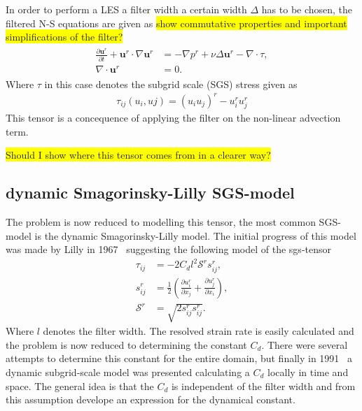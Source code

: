 In order to perform a LES a filter width a certain width $\Delta$ has to be chosen, 
the filtered N-S equations are given as 
\colorbox{yellow}{show commutative properties and important simplifications of the filter?}
%
\begin{align}
    \begin{split}
        \frac{\partial \mathbf{u}^r}{\partial t} + \mathbf{u}^r\cdot \nabla\mathbf{u}^r
        &= -\nabla p^r +\nu\Delta \mathbf{u}^r-\nabla \cdot \tau, \\
        \nabla \cdot \mathbf{u}^r &= 0.
    \end{split}
	\label{eq:NSfiltered}
\end{align}
%
Where $\tau$ in this case denotes the subgrid scale (SGS) stress given as 
\begin{align}
    \tau_{ij}(u_i,uj) = (u_iu_j)^r -u_i^ru_j^r
    \label{eq:sgstensor}
\end{align}
%
This tensor is a concequence of applying the filter on the non-linear advection term.

\colorbox{yellow}{Should I show where this tensor comes from in a clearer way?}

\subsection{dynamic Smagorinsky-Lilly SGS-model}
The problem is now reduced to modelling this tensor, the most common SGS-model is the 
dynamic Smagorinsky-Lilly model. The initial progress of this model was made by 
Lilly in 1967~\cite{Lilly67} suggesting the following model of the sgs-tensor
%
\begin{align}
    \tau_{ij} &= -2C_dl^2\mathcal{S}^rs_{ij}^r,\\
    s^r_{ij} &= \frac{1}{2}\left( \frac{\partial u^r_i}{\partial x_j} +
    \frac{\partial u^r_j}{\partial x_i}\right),\\
    \mathcal{S}^r &= \sqrt{2s^r_{ij}s^r_{ij}}.
    \label{eq:boussinesq}
\end{align}
%
Where $l$ denotes the filter width.
The resolved strain rate is easily calculated and the problem is now reduced to determining
the constant $C_d$. There were several attempts to determine this constant for the entire domain,
but finally in 1991~\cite{Germano91} a dynamic subgrid-scale model was presented calculating a 
$C_d$ locally in time and space. The general idea is that the $C_d$ is independent of the 
filter width and from this assumption develope an expression for the dynamical constant.

